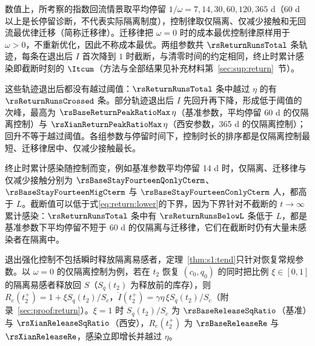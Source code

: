 数值上，所考察的指数回流情景取平均停留 $1/\omega=7,14,30,60,120,365$ d（60 d 以上是长停留诊断，不代表实际隔离制度），控制律取仅隔离、仅减少接触和无回流最优律迁移（简称迁移律）。迁移律把 $\omega=0$ 时的成本最优控制律原样用于 $\omega>0$，不重新优化，因此不称成本最优。两组参数共 $\rsReturnRunsTotal$ 条轨迹，每条在退出后 $I$ 首次降到 $1$ 时截断，与清零时间的约定相同，终止时累计感染即截断时刻的 $\Itcum$（方法与全部结果见补充材料第~\ref{sec:sup:return}~节）。

这些轨迹退出后都没有越过阈值：$\rsReturnRunsTotal$ 条中越过 $\eta$ 的有 $\rsReturnRunsCrossed$ 条。部分轨迹退出后 $I$ 先回升再下降，形成低于阈值的次峰，最高为 $\rsBaseReturnPeakRatioMax\,\eta$（基准参数，平均停留 60 d 的仅隔离控制）与 $\rsXianReturnPeakRatioMax\,\eta$（西安参数，365 d 的仅隔离控制）；回升不等于越过阈值。各组参数与停留时间下，控制时长的排序都是仅隔离控制最短、迁移律居中、仅减少接触最长。

终止时累计感染随控制而变，例如基准参数平均停留 14 d 时，仅隔离、迁移律与仅减少接触分别为 $\rsBaseStayFourteenQonlyCterm$、$\rsBaseStayFourteenMigCterm$ 与 $\rsBaseStayFourteenConlyCterm$ 人，都高于 $L$。截断值可以低于式\eqref{eq:return:lower}的下界，因为下界针对不截断的 $t\to\infty$ 累计感染：$\rsReturnRunsTotal$ 条中有 $\rsReturnRunsBelowL$ 条低于 $L$，都是基准参数下平均停留不短于 60 d 的仅隔离与迁移律，它们在截断时仍有大量未感染者在隔离中。

退出强化控制不包括瞬时释放隔离易感者，定理~\ref{thm:s1:tend}只针对恢复常规参数。以 $\omega=0$ 的仅隔离控制为例，若在 $t_2$ 恢复 $(c_0,q_0)$ 的同时把比例 $\xi\in[0,1]$ 的隔离易感者释放回 $S$（$S_q(t_2)$ 为释放前的库存），则 $R_e(t_2^+)=1+\xi S_q(t_2)/S_c$，$\dot I(t_2^+)=\gamma\eta\,\xi S_q(t_2)/S_c$（附录~\ref{sec:proof:return}）。$\xi=1$ 时 $S_q(t_2)/S_c$ 为 $\rsBaseReleaseSqRatio$（基准）与 $\rsXianReleaseSqRatio$（西安），$R_e(t_2^+)$ 为 $\rsBaseReleaseRe$ 与 $\rsXianReleaseRe$，感染立即增长并越过 $\eta$。

